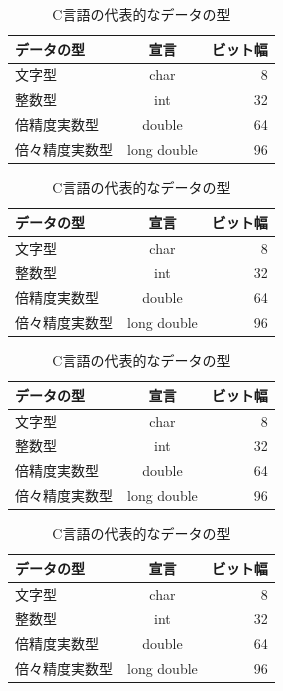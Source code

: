\begin{table}[hbtp]
  \caption{C言語の代表的なデータの型}
  \label{table:data_type}
  \centering
  \begin{tabular}{lcr}
    \hline
    データの型  & 宣言  &  ビット幅  \\
    \hline \hline
    文字型  & char  & 8 \\
    整数型  & int   & 32 \\
    倍精度実数型  & double  & 64 \\
    倍々精度実数型  &  long double  &  96 \\
    \hline
  \end{tabular}
\end{table}

\begin{table}[hbtp]
  \caption{C言語の代表的なデータの型}
  \label{table:data_type}
  \centering
  \begin{tabular}{lcr}
    \hline
    データの型  & 宣言  &  ビット幅  \\
    \hline \hline
    文字型  & char  & 8 \\
    整数型  & int   & 32 \\
    倍精度実数型  & double  & 64 \\
    倍々精度実数型  &  long double  &  96 \\
    \hline
  \end{tabular}
\end{table}

\begin{table}[hbtp]
  \caption{C言語の代表的なデータの型}
  \label{table:data_type}
  \centering
  \begin{tabular}{lcr}
    \hline
    データの型  & 宣言  &  ビット幅  \\
    \hline \hline
    文字型  & char  & 8 \\
    整数型  & int   & 32 \\
    倍精度実数型  & double  & 64 \\
    倍々精度実数型  &  long double  &  96 \\
    \hline
  \end{tabular}
\end{table}

\begin{table}[hbtp]
  \caption{C言語の代表的なデータの型}
  \label{table:data_type}
  \centering
  \begin{tabular}{lcr}
    \hline
    データの型  & 宣言  &  ビット幅  \\
    \hline \hline
    文字型  & char  & 8 \\
    整数型  & int   & 32 \\
    倍精度実数型  & double  & 64 \\
    倍々精度実数型  &  long double  &  96 \\
    \hline
  \end{tabular}
\end{table}

